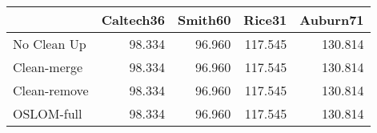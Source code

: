 \begin{tabular}{lrrrr}
\toprule
{} & Caltech36 & Smith60 &  Rice31 & Auburn71 \\
\midrule
No Clean Up  &    98.334 &  96.960 & 117.545 &  130.814 \\
Clean-merge  &    98.334 &  96.960 & 117.545 &  130.814 \\
Clean-remove &    98.334 &  96.960 & 117.545 &  130.814 \\
OSLOM-full   &    98.334 &  96.960 & 117.545 &  130.814 \\
\bottomrule
\end{tabular}

